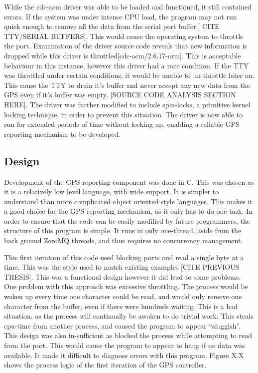 While the cdc-acm driver was able to be loaded and functioned, it still contained errors. If the system was under intense CPU load, the program may not run quick enough to remove all the data from the serial port buffer.[ CITE TTY/SERIAL BUFFERS]. This would cause the operating system to throttle the port. Examination of the driver source code reveals that new information is dropped while this driver is throttled[cdc-acm/2.6.17-arm]. This is acceptable behaviour in this instance, however this driver had a race condition. If the TTY was throttled under certain conditions, it would be unable to un-throttle later on. This cause the TTY to drain it’s buffer and never accept any new data from the GPS even if it’s buffer was empty. [SOURCE CODE ANALYSIS SECTION HERE]. The driver was further modified to include spin-locks, a primitive kernel locking technique, in order to prevent this situation. The driver is now able to run for extended periods of time without locking up, enabling a reliable GPS reporting mechanism to be developed. 

\subsection {Design}

Development of the GPS reporting component was done in C. This was chosen as it is a relatively low level language, with wide support. It is simpler to understand than more complicated object oriented style languages. This makes it a good choice for the GPS reporting mechanism, as it only has to do one task. In order to ensure that the code can be easily modified by future programmers, the structure of this program is simple. It runs in only one-thread, aside from the back ground ZeroMQ threads, and thus requires no concurrency management.

This first iteration of this code used blocking ports and read a single byte at a time. This was the style used to match existing examples [CITE PREVIOUS THESIS]. This was a functional design however it did lead to some problems. One problem with this approach was excessive throttling. The process would be woken up every time one character could be read, and would only remove one character from the buffer, even if there were hundreds waiting. This is a bad situation, as the process will continually be awoken to do trivial work. This steals cpu-time from another process, and caused the program to appear “sluggish”. This design was also in-sufficient as blocked the process while attempting to read from the port. This would cause the program to appear to hang if no data was available. It made it difficult to diagnose errors with this program. Figure X.X shows the process logic of the first iteration of the GPS controller.

